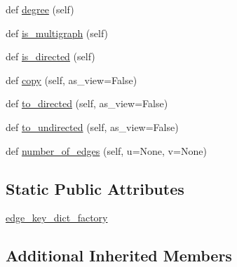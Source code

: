 \begin{DoxyCompactItemize}
\item 
def \hyperlink{classnetworkx_1_1classes_1_1multigraph_1_1MultiGraph_aa046c07b6417eb53e754adc9b1b631b0}{degree} (self)
\item 
def \hyperlink{classnetworkx_1_1classes_1_1multigraph_1_1MultiGraph_a4eb4204a4b136b33a6b1f7d73b744136}{is\+\_\+multigraph} (self)
\item 
def \hyperlink{classnetworkx_1_1classes_1_1multigraph_1_1MultiGraph_a8e32791f2d1b790fe66d7e9df899778c}{is\+\_\+directed} (self)
\item 
def \hyperlink{classnetworkx_1_1classes_1_1multigraph_1_1MultiGraph_ab39351b96b86b8717820cec0c7f72400}{copy} (self, as\+\_\+view=False)
\item 
def \hyperlink{classnetworkx_1_1classes_1_1multigraph_1_1MultiGraph_a1554db7ceb80fe185bf1572bc310f225}{to\+\_\+directed} (self, as\+\_\+view=False)
\item 
def \hyperlink{classnetworkx_1_1classes_1_1multigraph_1_1MultiGraph_a83bc2a7096c66f75d86d9132934f8337}{to\+\_\+undirected} (self, as\+\_\+view=False)
\item 
def \hyperlink{classnetworkx_1_1classes_1_1multigraph_1_1MultiGraph_a3106d334d033a0421b40712b28775e0b}{number\+\_\+of\+\_\+edges} (self, u=None, v=None)
\end{DoxyCompactItemize}
\subsection*{Static Public Attributes}
\begin{DoxyCompactItemize}
\item 
\hyperlink{classnetworkx_1_1classes_1_1multigraph_1_1MultiGraph_a2ef3b68f7d053dbb60fe26faca6ccb1e}{edge\+\_\+key\+\_\+dict\+\_\+factory}
\end{DoxyCompactItemize}
\subsection*{Additional Inherited Members}


